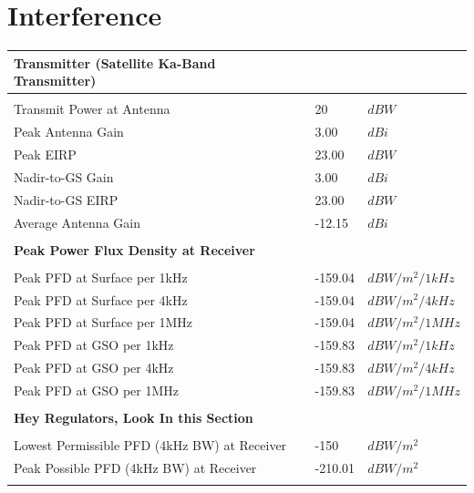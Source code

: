 \documentclass{article}
\begin{document}
\section{Interference}
\label{section::interference}
\begin{center}
  \begin{tabular}{p{3in}p{1in}l}
\textbf{Transmitter (Satellite Ka-Band Transmitter)} & & \\
\hline \\
Transmit Power at Antenna & 20 & $dBW$ \\
Peak Antenna Gain & 3.00 & $dBi$ \\
Peak EIRP & 23.00 & $dBW$ \\
Nadir-to-GS Gain & 3.00 & $dBi$ \\
Nadir-to-GS EIRP & 23.00 & $dBW$ \\
Average Antenna Gain & -12.15 & $dBi$ \\
\\
\textbf{Peak Power Flux Density at Receiver} & & \\
\hline \\
Peak PFD at Surface per 1kHz & -159.04 & $dBW/m^2/1kHz$ \\
Peak PFD at Surface per 4kHz & -159.04 & $dBW/m^2/4kHz$ \\
Peak PFD at Surface per 1MHz & -159.04 & $dBW/m^2/1MHz$ \\
Peak PFD at GSO per 1kHz & -159.83 & $dBW/m^2/1kHz$ \\
Peak PFD at GSO per 4kHz & -159.83 & $dBW/m^2/4kHz$ \\
Peak PFD at GSO per 1MHz & -159.83 & $dBW/m^2/1MHz$ \\
\\
\textbf{Hey Regulators, Look In this Section} & & \\
\hline \\
Lowest Permissible PFD (4kHz BW) at Receiver & -150 & $dBW/m^2$ \\
Peak Possible PFD (4kHz BW) at Receiver & -210.01 & $dBW/m^2$ \\
\\
\end{tabular}

  
\end{center}


\newpage
\end{document}
